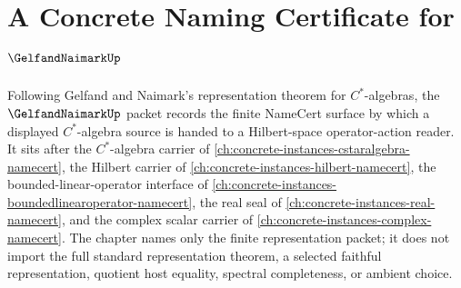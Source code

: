 \chapter{A Concrete Naming Certificate for $\GelfandNaimarkUp$}
\label{ch:concrete-instances-gelfand-naimark-namecert}

Following Gelfand and Naimark's representation theorem for $C^*$-algebras, the $\GelfandNaimarkUp$ packet records the finite NameCert surface by which a displayed $C^*$-algebra source is handed to a Hilbert-space operator-action reader. It sits after the $C^*$-algebra carrier of \autoref{ch:concrete-instances-cstaralgebra-namecert}, the Hilbert carrier of \autoref{ch:concrete-instances-hilbert-namecert}, the bounded-linear-operator interface of \autoref{ch:concrete-instances-boundedlinearoperator-namecert}, the real seal of \autoref{ch:concrete-instances-real-namecert}, and the complex scalar carrier of \autoref{ch:concrete-instances-complex-namecert}. The chapter names only the finite representation packet; it does not import the full standard representation theorem, a selected faithful representation, quotient host equality, spectral completeness, or ambient choice.

